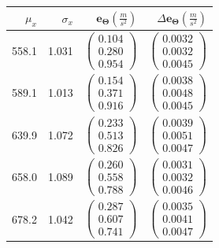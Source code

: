 \documentclass[10pt,pdftex]{report}
\begin{document}
\begin{table}[H]
    \centering
    \begin{tabular}{|r|r|r|r|}
        \hline
        $\mu_x$ & $\sigma_x$ & $\mathbf{e_{\Theta}}(\frac{m}{s^2})$ & $\Delta\mathbf{e_{\Theta}}(\frac{m}{s^2})$ \\
        \hline
        558.1 & 1.031 & $\begin{pmatrix} 0.104 \\ 0.280 \\ 0.954\end{pmatrix}$ & $\begin{pmatrix} 0.0032 \\ 0.0032 \\ 0.0045\end{pmatrix}$ \\
        \hline
        589.1 & 1.013 & $\begin{pmatrix} 0.154 \\ 0.371 \\ 0.916\end{pmatrix}$ & $\begin{pmatrix} 0.0038 \\ 0.0048 \\ 0.0045\end{pmatrix}$ \\
        \hline
        639.9 & 1.072 & $\begin{pmatrix} 0.233 \\ 0.513 \\ 0.826\end{pmatrix}$ & $\begin{pmatrix} 0.0039 \\ 0.0051 \\ 0.0047\end{pmatrix}$ \\
        \hline
        658.0 & 1.089 & $\begin{pmatrix} 0.260 \\ 0.558 \\ 0.788\end{pmatrix}$ & $\begin{pmatrix} 0.0031 \\ 0.0032 \\ 0.0046\end{pmatrix}$ \\
        \hline
        678.2 & 1.042 & $\begin{pmatrix} 0.287 \\ 0.607 \\ 0.741\end{pmatrix}$ & $\begin{pmatrix} 0.0035 \\ 0.0041 \\ 0.0047\end{pmatrix}$ \\

\end{tabular}
\end{table}
\end{document}
